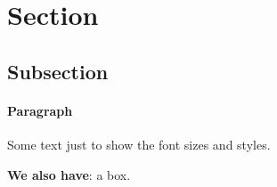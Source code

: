 \section{Section}
\subsection{Subsection}
\paragraph{Paragraph}
Some text just to show the font sizes and styles. \cite{Me}
\begin{tcolorbox}[boxstyle]
    \textbf{We also have}:
    a box.
\end{tcolorbox}